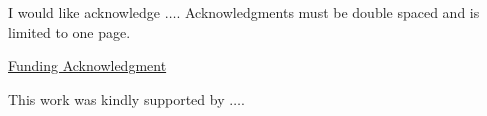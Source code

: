 
\begin{center}\noindent
\begin{minipage}{5.625in}
\hspace{5ex} I would like acknowledge $\dots$. Acknowledgments must be double spaced and is limited to one page. \lipsum[10] %

\vspace{0.5in}
\begin{center}
\underline{Funding Acknowledgment}\\
\end{center}
\hspace{5ex} This work was kindly supported by $\dots$.  \lipsum[2] %

\end{minipage}
\end{center}
